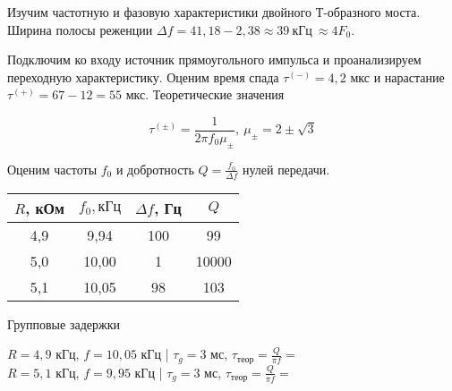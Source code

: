 
	\noindent Изучим частотную и фазовую характеристики двойного Т-образного моста. 
	\noindent Ширина полосы реженции $\Delta f = 41, 18 - 2,38 \approx 39 ~ \text{кГц} ~ \approx 4 F_0$.


	\noindent Подключим ко входу источник прямоугольного импульса и проанализируем переходную характеристику. 
	Оценим время спада $\tau^{(-)} = 4,2$ мкс и нарастание $\tau^{(+)} = 67 - 12 = 55$ мкс.
	\noindent Теоретические значения

	\begin{equation*}
		\tau^{(\pm)} = \frac{1}{2 \pi f_0 \mu_{\pm}}, ~ \mu_{\pm} = 2 \pm \sqrt{3}
	\end{equation*}


	\noindent Оценим частоты $f_0$ и добротность $Q = \frac{f_0}{\Delta f}$ нулей передачи.

	\begin{table}[h!]
		\begin{center}
			\begin{tabular}{|c|c|c|c|}
				\hline
				$R$, кОм & $f_0, кГц$ & $\Delta f$, Гц  & $Q$      \\ \hline
				4,9      & 9,94       & 100             & 99       \\ \hline
				5,0      & 10,00      & 1               & 10000    \\ \hline
				5,1      & 10,05      & 98              & 103      \\ \hline
			\end{tabular}
		\end{center}
	\end{table}

	\noindent Групповые задержки

	\begin{center}
		$R = 4,9$ кГц, $f = 10,05$ кГц | $\tau_g = 3$ мс, $\tau_{теор} = \frac{Q}{\pi f} = $ \\
		$R = 5,1$ кГц, $f = 9,95$  кГц | $\tau_g = 3$ мс, $\tau_{теор} = \frac{Q}{\pi f} = $
	\end{center}

